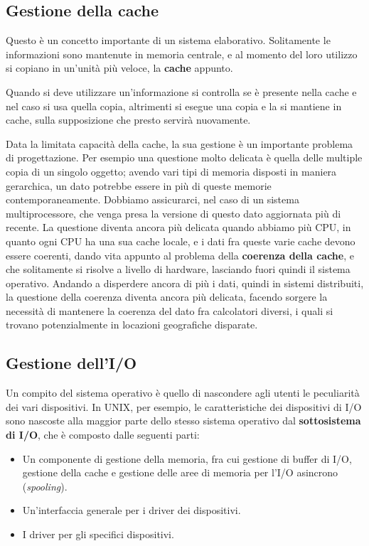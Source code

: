    \subsection{Gestione della cache}
        Questo è un concetto importante di un sistema elaborativo. Solitamente le informazioni sono mantenute in memoria centrale, e al momento del loro utilizzo si copiano in un'unità più veloce, la \textbf{cache} appunto.
        
        Quando si deve utilizzare un'informazione si controlla se è presente nella cache e nel caso si usa quella copia, altrimenti si esegue una copia e la si mantiene in cache, sulla supposizione che presto servirà nuovamente.
        
        Data la limitata capacità della cache, la sua gestione è un importante problema di progettazione. Per esempio una questione molto delicata è quella delle multiple copia di un singolo oggetto; avendo vari tipi di memoria disposti in maniera gerarchica, un dato potrebbe essere in più di queste memorie contemporaneamente. Dobbiamo assicurarci, nel caso di un sistema multiprocessore, che venga presa la versione di questo dato aggiornata più di recente. La questione diventa ancora più delicata quando abbiamo più CPU, in quanto ogni CPU ha una sua cache locale, e i dati fra queste varie cache devono essere coerenti, dando vita appunto al problema della \textbf{coerenza della cache}, e che solitamente si risolve a livello di hardware, lasciando fuori quindi il sistema operativo. Andando a disperdere ancora di più i dati, quindi in sistemi distribuiti, la questione della coerenza diventa ancora più delicata, facendo sorgere la necessità di mantenere la coerenza del dato fra calcolatori diversi, i quali si trovano potenzialmente in locazioni geografiche disparate.
        
    \subsection{Gestione dell'I/O}
        Un compito del sistema operativo è quello di nascondere agli utenti le peculiarità dei vari dispositivi. In UNIX, per esempio, le caratteristiche dei dispositivi di I/O sono nascoste alla maggior parte dello stesso sistema operativo dal \textbf{sottosistema di I/O}, che è composto dalle seguenti parti:
        
        \begin{itemize}
            \item Un componente di gestione della memoria, fra cui gestione di buffer di I/O, gestione della cache e gestione delle aree di memoria per l'I/O asincrono (\textit{spooling}).
            \item Un'interfaccia generale per i driver dei dispositivi.
            \item I driver per gli specifici dispositivi.
        \end{itemize}
        
